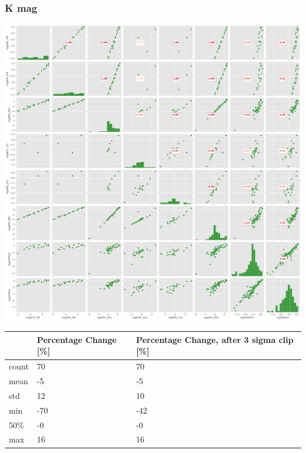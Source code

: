 \documentclass[
]{article}
\begin{document}
\subsubsection{K mag}

\includegraphics{compare_files/figure-pdf/cell-38-output-1.pdf}

\begin{longtable}[]{@{}lll@{}}
\toprule\noalign{}
& Percentage Change {[}\%{]} & Percentage Change, after 3 sigma clip
{[}\%{]} \\
\midrule\noalign{}
\endhead
\bottomrule\noalign{}
\endlastfoot
count & 70 & 70 \\
mean & -5 & -5 \\
std & 12 & 10 \\
min & -70 & -42 \\
50\% & -0 & -0 \\
max & 16 & 16 \\
\end{longtable}
\end{document}
